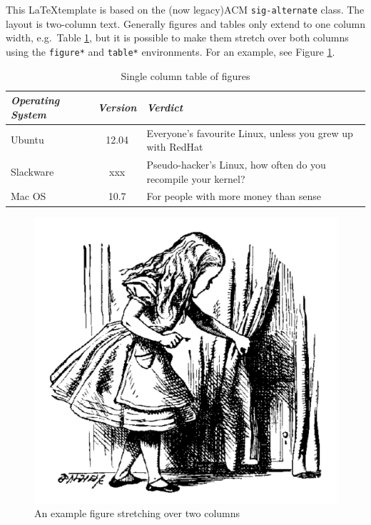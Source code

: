 \documentclass{mpaper}
\begin{document}
This \LaTeX template is based on the (now legacy)ACM
\texttt{sig-alternate} class.
The layout is two-column text. Generally figures and tables only
extend to one column width, e.g.\ Table \ref{tab-eg},
but it is possible to make them
stretch over both columns using the \texttt{figure*} and
\texttt{table*} environments. For an example, see Figure \ref{fig-eg}.

\begin{table}
\begin{tabular}{l||c||p{2cm}}
\emph{Operating System} & \emph{Version} & \emph{Verdict} \\ \hline \hline
Ubuntu & 12.04 & Everyone's favourite Linux, unless you grew up with
RedHat \\ \hline
Slackware & xxx & Pseudo-hacker's Linux, how often do you recompile
your kernel? \\ \hline
Mac OS & 10.7 & For people with more money than sense \\ \hline
\end{tabular}
\caption{\label{tab-eg}Single column table of figures}
\end{table}

\begin{figure}
\begin{center}
\includegraphics[scale=0.3]{alice.pdf}
\end{center}
\caption{\label{fig-eg}An example figure stretching over two columns}
\end{figure}
\end{document}
